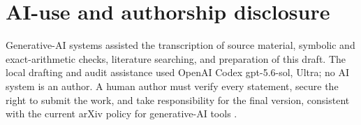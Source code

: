 \documentclass[11pt]{amsart}
\theoremstyle{plain}
\theoremstyle{definition}
\theoremstyle{remark}
\begin{document}
\section*{AI-use and authorship disclosure}

Generative-AI systems assisted the transcription of source material, symbolic
and exact-arithmetic checks, literature searching, and preparation of this
draft.  The local drafting and audit assistance used OpenAI Codex gpt-5.6-sol,
Ultra; no AI system is an author.  A human author must verify every statement,
secure the right to submit the work, and take responsibility for the final
version, consistent with the current arXiv policy for generative-AI tools
\cite{arXivModeration}.



\end{document}
